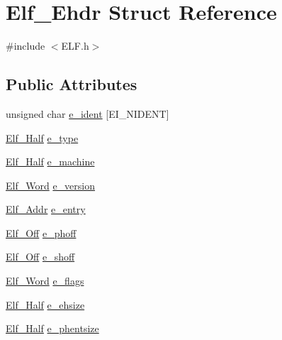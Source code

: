 \hypertarget{struct_elf___ehdr}{\section{Elf\+\_\+\+Ehdr Struct Reference}
\label{struct_elf___ehdr}
}


{\ttfamily \#include $<$E\+L\+F.\+h$>$}

\subsection*{Public Attributes}
\begin{DoxyCompactItemize}
\item 
unsigned char \hyperlink{struct_elf___ehdr_af7265f2071ee0e07b51fee581e6fd80f}{e\+\_\+ident} \mbox{[}E\+I\+\_\+\+N\+I\+D\+E\+N\+T\mbox{]}
\item 
\hyperlink{_e_l_f_8h_aaf9fe3321fba0710dcfd99e46b3e0fa8}{Elf\+\_\+\+Half} \hyperlink{struct_elf___ehdr_afee2ba36e8002b99ab3ae04e9e46c682}{e\+\_\+type}
\item 
\hyperlink{_e_l_f_8h_aaf9fe3321fba0710dcfd99e46b3e0fa8}{Elf\+\_\+\+Half} \hyperlink{struct_elf___ehdr_ad18150e5a46a0ff5dd22a80842661d7d}{e\+\_\+machine}
\item 
\hyperlink{_e_l_f_8h_a497c5f6b52d8b0a104779c9e0c2da019}{Elf\+\_\+\+Word} \hyperlink{struct_elf___ehdr_ad28de2914498d3177a86b04fc0ff59a2}{e\+\_\+version}
\item 
\hyperlink{_e_l_f_8h_a83694be97fb890d1883ac3c680ca523d}{Elf\+\_\+\+Addr} \hyperlink{struct_elf___ehdr_a16d86c71e10335897fe770fd83ab8678}{e\+\_\+entry}
\item 
\hyperlink{_e_l_f_8h_a09549f5ac4e10f52b46f6dba8d8623bd}{Elf\+\_\+\+Off} \hyperlink{struct_elf___ehdr_a4f96eebec78fafa5914025d80dccb451}{e\+\_\+phoff}
\item 
\hyperlink{_e_l_f_8h_a09549f5ac4e10f52b46f6dba8d8623bd}{Elf\+\_\+\+Off} \hyperlink{struct_elf___ehdr_a70667851b5ea9da70a987c770b0fa509}{e\+\_\+shoff}
\item 
\hyperlink{_e_l_f_8h_a497c5f6b52d8b0a104779c9e0c2da019}{Elf\+\_\+\+Word} \hyperlink{struct_elf___ehdr_aee13223e1a74d7b6202ee826930dcda0}{e\+\_\+flags}
\item 
\hyperlink{_e_l_f_8h_aaf9fe3321fba0710dcfd99e46b3e0fa8}{Elf\+\_\+\+Half} \hyperlink{struct_elf___ehdr_a2f6e336e9e6fd90134c8baf86770c548}{e\+\_\+ehsize}
\item 
\hyperlink{_e_l_f_8h_aaf9fe3321fba0710dcfd99e46b3e0fa8}{Elf\+\_\+\+Half} \hyperlink{struct_elf___ehdr_af7f3c65efd70671194ace0bceef71df4}{e\+\_\+phentsize}

\end{DoxyCompactItemize}
